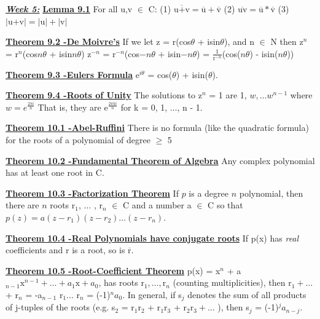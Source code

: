 \documentclass[10pt]{article}
\begin{document}
\par\textbf{\underline{\textit{Week 5:}}}
\textbf{\underline{Lemma 9.1}}
For all u,v $\in$ C:
(1) $\overline{\mbox{u+v}} = \overline{\mbox{u}}+\overline{\mbox{v}}$
(2) $\overline{\mbox{uv}} = \overline{\mbox{u}} * \overline{\mbox{v}}$
(3) $ |\mbox{u+v}| = |\mbox{u}|+|\mbox{v}|$
\par\textbf{\underline{Theorem 9.2 -De Moivre's}}
If we let z = r(cos$\theta$ + isin$\theta$), and n $\in$ N then
z$^n$ = r$^n$(cos$ n\theta$ + isin$ n\theta$)
z$^{-n}$ = r$^{-n}$(cos$ -n\theta$ + isin$ -n\theta$) =  $\frac{1}{\mbox{r}^{-n}}$(cos($ n\theta$) - isin($ n\theta$))
\par\textbf{\underline{Theorem 9.3 -Eulers Formula}}
e$^{i\theta}$ = cos($\theta$) + isin($\theta$).
\par\textbf{\underline{Theorem 9.4 -Roots of Unity}}
The solutions to z$^n$ = 1 are 1, $w, \dots w^{n-1}$ where $w = e^{\frac{2\pi i}{n}}$
That is, they are e$^{\frac{2\pi k i}{n}}$
for k = 0, 1, $\dots $, n - 1.
\par\textbf{\underline{Theorem 10.1 -Abel-Ruffini}}
There is no formula (like the quadratic formula)
for the roots of a polynomial of degree $\geq$ 5
\par\textbf{\underline{Theorem 10.2 -Fundamental Theorem of Algebra}}
Any complex polynomial has at
least one root in C.
\par\textbf{\underline{Theorem 10.3 -Factorization Theorem}}
If $p$ is a degree $n$ polynomial, then there are $n$
roots r$_1$, $\dots$ , r$_n$ $\in$ C and a number a $\in$ C so that
$p(z) = a(z - r_1)(z - r_2) \dots (z - r_n).$
\par\textbf{\underline{Theorem 10.4 -Real Polynomials have conjugate roots}}
If p(x) has \textit{real} coefficients and
r is a root, so is $\overline{\mbox{r}}$.
\par\textbf{\underline{Theorem 10.5 -Root-Coefficient Theorem}}
p(x) = x$^n$ + a$_{n-1}\mbox{x}^{n-1} + \dots + a_1\mbox{x} + a_0$, has
roots r$_1, \dots, \mbox{r}_n$ (counting multiplicities), then
r$_1 + \dots$ + r$_n$ = -a$_{n-1}$
r$_1 \dots$ r$_n$ = (-1)$^na_0$.
In general, if s$_j$ denotes the sum of all products of j-tuples of the roots (e.g. s$_2$ =
r$_1$r$_2$ + r$_1$r$_3$ + r$_2$r$_3 + \dots$ ), then
s$_j$ = (-1)$^ja_{n-j}.$
\end{document}
